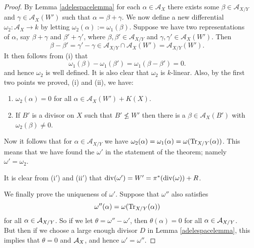 \begin{proof}
By Lemma \ref{adelespacelemma} for each $\alpha \in \mathcal{A}_X$ there exists some $\beta \in \mathcal{A}_{X/Y}$ and $\gamma \in \mathcal{A}_X(W')$ such that $\alpha = \beta + \gamma$.
We now define a new differential $\omega_2 \colon  \mathcal{A}_X \rightarrow k$ by letting $\omega_2(\alpha) := \omega_1(\beta)$.
Suppose we have two representations of $\alpha$, say $\beta+ \gamma$ and $\beta' + \gamma'$, where $\beta, \beta' \in \mathcal{A}_{X/Y}$ and $\gamma, \gamma' \in \mathcal{A}_{X}(W')$.
Then 
\[
  \beta - \beta' = \gamma' - \gamma \in \mathcal{A}_{X/Y} \cap \mathcal{A}_X(W') = \mathcal{A}_{X/Y}(W').
\]
It then follows from (i) that 
\[
 \omega_1(\beta) - \omega_1(\beta') = \omega_1(\beta - \beta') = 0.
 \]
and hence $\omega_2$ is well defined.
It is also clear that $\omega_2$ is $k$-linear.
Also, by the first two points we proved, (i) and (ii), we have:
\begin{enumerate}[(i$'$)]
 \item $\omega_2(\alpha) = 0$ for all $\alpha \in \mathcal{A}_X(W') + K(X)$.
 \item If $B'$ is a divisor on $X$ such that $B'\nleq W'$ then there is a $\beta \in \mathcal{A}_X(B')$ with $\omega_2(\beta) \neq 0$.
\end{enumerate}


Now it follows that for $\alpha \in \mathcal{A}_{X/Y}$ we have $\omega_2(\alpha) = \omega_1(\alpha) = \omega(\operatorname{Tr}_{X/Y}(\alpha))$.
This means that we have found the $\omega'$ in the statement of the theorem; namely $\omega' = \omega_2$.

It is clear from (i$'$) and (ii$'$) that $\operatorname{div}(\omega') = W' = \pi^*(\operatorname{div}(\omega)) + R$.

We finally prove the uniqueness of $\omega'$.
Suppose that $\omega''$ also satisfies 
\[
 \omega''(\alpha) = \omega(\operatorname{Tr}_{X/Y}(\alpha))
\]
for all $\alpha\in {\mathcal A}_{X/Y}$.
So if we let $\theta = \omega'' - \omega'$, then $\theta(\alpha) = 0$ for all $\alpha \in {\mathcal A}_{X/Y}$.
But then if we choose a large enough divisor $D$ in Lemma \ref{adelespacelemma}, this implies that $\theta = 0$ and ${\mathcal A}_X$, and hence $\omega' = \omega''$.
\begin{comment}
If $\omega = 0$ this is clear.
The order of the differential at any point can be determined by the equality of divisors,
\[
(\pi^*(\omega) ) = \pi^*((\omega)) + R.
\]
If differential is a unit at a point, it's precise value can be determined by the equality
\[
\omega'(\alpha) = \Tr_{X/Y}(\omega(\alpha)).
\]
{\bf check this last part}
\end{comment}
\end{proof}


